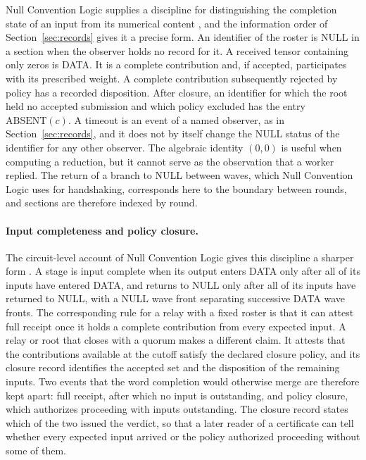 \documentclass[11pt]{article}
\theoremstyle{definition}
\theoremstyle{remark}
\begin{document}
Null Convention Logic supplies a discipline for distinguishing the completion state of an input from its numerical content \cite{fant1996,fant2005}, and the information order of Section~\ref{sec:records} gives it a precise form. An identifier of the roster is NULL in a section when the observer holds no record for it. A received tensor containing only zeros is DATA. It is a complete contribution and, if accepted, participates with its prescribed weight. A complete contribution subsequently rejected by policy has a recorded disposition. After closure, an identifier for which the root held no accepted submission and which policy excluded has the entry $\mathrm{ABSENT}(c)$. A timeout is an event of a named observer, as in Section~\ref{sec:records}, and it does not by itself change the NULL status of the identifier for any other observer. The algebraic identity $(0,0)$ is useful when computing a reduction, but it cannot serve as the observation that a worker replied. The return of a branch to NULL between waves, which Null Convention Logic uses for handshaking, corresponds here to the boundary between rounds, and sections are therefore indexed by round.

\paragraph{Input completeness and policy closure.} The circuit-level account of Null Convention Logic gives this discipline a sharper form \cite[Sec.~2.1, p.~12]{kim2020}. A stage is input complete when its output enters DATA only after all of its inputs have entered DATA, and returns to NULL only after all of its inputs have returned to NULL, with a NULL wave front separating successive DATA wave fronts. The corresponding rule for a relay with a fixed roster is that it can attest full receipt once it holds a complete contribution from every expected input. A relay or root that closes with a quorum makes a different claim. It attests that the contributions available at the cutoff satisfy the declared closure policy, and its closure record identifies the accepted set and the disposition of the remaining inputs. Two events that the word completion would otherwise merge are therefore kept apart: full receipt, after which no input is outstanding, and policy closure, which authorizes proceeding with inputs outstanding. The closure record states which of the two issued the verdict, so that a later reader of a certificate can tell whether every expected input arrived or the policy authorized proceeding without some of them.
\end{document}
